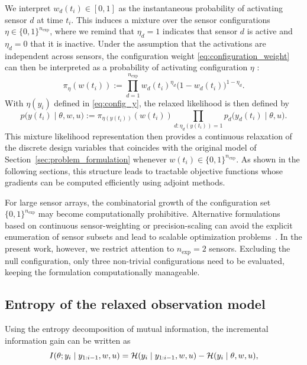 \documentclass[a4paper,11pt]{article}
\begin{document}
We interpret $w_{d}(t_i)\in[0,1]$ as the instantaneous probability of activating sensor $d$ at time $t_i$. This induces a mixture over the sensor configurations $\eta\in\{0,1\}^{n_{\mathrm{exp}}}$, where we remind that $\eta_d=1$ indicates that sensor $d$ is active and $\eta_d=0$ that it is inactive.
Under the assumption that the activations are independent across sensors, the configuration weight \eqref{eq:configuration_weight} can then be interpreted as a probability of activating configuration $\eta$ :
\begin{equation}
\pi_\eta(w(t_i))
:=
\prod_{d=1}^{n_{\mathrm{exp}}}
w_d(t_i)^{\eta_d}
\bigl(1-w_d(t_i)\bigr)^{1-\eta_d}.
\end{equation}
With $\eta(y_i)$ defined in \eqref{eq:config_y}, the relaxed likelihood is then defined by
\begin{equation} \label{eq:likelihood_relax}
p\big(y(t_i) \mid \theta, w, u\big)
:=
\pi_{\eta(y(t_i))}(w(t_i))
\prod_{d:\eta_d(y(t_i))=1}
p_d\big(y_{d}(t_i) \mid \theta, u\big).
\end{equation}
This mixture likelihood representation then provides a continuous relaxation of the discrete design variables
that coincides with the original model of Section~\ref{sec:problem_formulation} whenever $w(t_i)\in\{0,1\}^{n_{\mathrm{exp}}}$. As shown in the following sections, this structure leads to tractable objective functions whose gradients can be computed efficiently using adjoint methods.

For large sensor arrays, the combinatorial growth of the configuration set 
$\{0,1\}^{n_{\mathrm{exp}}}$ may become computationally prohibitive. 
Alternative formulations based on continuous sensor-weighting or precision-scaling 
can avoid the explicit enumeration of sensor subsets and lead to scalable optimization 
problems~\cite{Haber2008,Alexanderian2014}. 
In the present work, however, we restrict attention to $n_{\mathrm{exp}}=2$ sensors. 
Excluding the null configuration, only three non-trivial configurations need to be 
evaluated, keeping the formulation computationally manageable.


\subsection{Entropy of the relaxed observation model}

Using the entropy decomposition of mutual information, the incremental information gain can be written as
\begin{equation}
I(\theta; y_i \mid y_{1:i-1}, w, u)
=
{\cal H}(y_i \mid y_{1:i-1}, w, u)
-
{\cal H}(y_i \mid \theta, w, u),
\end{equation}
\end{document}
